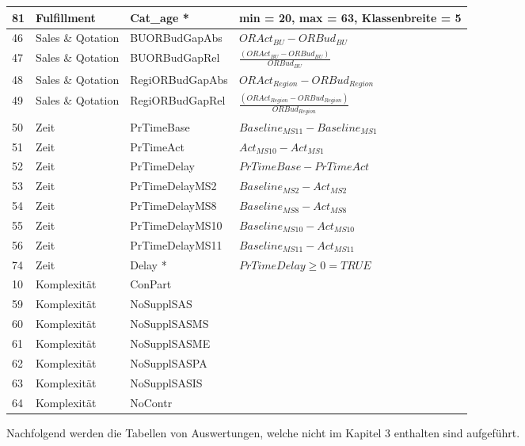 \begin{longtable}{p{0.5cm}|p{4cm}|p{3.5cm}|p{6cm}}
	81    & Fulfillment & Cat\_age * & \small min = 20, max = 63, Klassenbreite = 5\\\hline
	46    & Sales \& Qotation & BUORBudGapAbs & $OR Act_{BU}-OR Bud_{BU}$ \\
	47    & Sales \& Qotation & BUORBudGapRel & $\frac{(ORAct_{BU}-ORBud_{BU})}{ORBud_{BU}}$\\
	48    & Sales \& Qotation & RegiORBudGapAbs & $OR Act_{Region}-OR Bud_{Region}$\\
	49    & Sales \& Qotation & RegiORBudGapRel & $\frac{(ORAct_{Region}-ORBud_{Region})}{ORBud_{Region}}$\\\hline
	50    & Zeit  & PrTimeBase & $Baseline_{MS11}-Baseline_{MS1}$ \\
	51    & Zeit  & PrTimeAct & $Act_{MS10}-Act_{MS1}$ \\
	52    & Zeit  & PrTimeDelay & $PrTimeBase - PrTimeAct$\\
	53    & Zeit  & PrTimeDelayMS2 & $Baseline_{MS2}-Act_{MS2}$\\
	54    & Zeit  & PrTimeDelayMS8 & $Baseline_{MS8}-Act_{MS8}$\\
	55    & Zeit  & PrTimeDelayMS10 & $Baseline_{MS10}-Act_{MS10}$\\
	56    & Zeit  & PrTimeDelayMS11 & $Baseline_{MS11}-Act_{MS11}$\\
	74    & Zeit  & Delay * & $PrTimeDelay \geq 0 = TRUE$\\\hline
	10    & Komplexität & ConPart & \\
	59    & Komplexität & NoSupplSAS & \\
	60    & Komplexität & NoSupplSASMS & \\
	61    & Komplexität & NoSupplSASME & \\
	62    & Komplexität & NoSupplSASPA & \\
	63    & Komplexität & NoSupplSASIS & \\
	64    & Komplexität & NoContr & \\	
\end{longtable}
\newpage
Nachfolgend werden die Tabellen von Auswertungen, welche nicht im Kapitel 3 enthalten sind aufgeführt.
